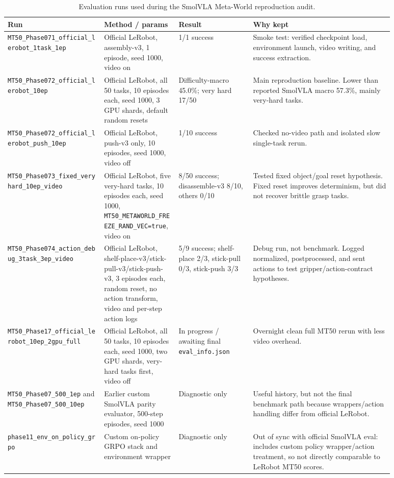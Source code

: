 \documentclass{article}
\begin{document}
\begin{table}[h]
  \centering
  \small
  \begin{tabular}{p{0.22\linewidth}p{0.17\linewidth}p{0.17\linewidth}p{0.32\linewidth}}
    \toprule
    Run & Method / params & Result & Why kept \\
    \midrule
    \texttt{MT50\_Phase071\_official\_lerobot\_1task\_1ep} & Official LeRobot, assembly-v3, 1 episode, seed 1000, video on & 1/1 success & Smoke test: verified checkpoint load, environment launch, video writing, and success extraction. \\
    \texttt{MT50\_Phase072\_official\_lerobot\_10ep} & Official LeRobot, all 50 tasks, 10 episodes each, seed 1000, 3 GPU shards, default random resets & Difficulty-macro 45.0\%; very hard 17/50 & Main reproduction baseline.  Lower than reported SmolVLA macro 57.3\%, mainly very-hard tasks. \\
    \texttt{MT50\_Phase072\_official\_lerobot\_push\_10ep} & Official LeRobot, push-v3 only, 10 episodes, seed 1000, video off & 1/10 success & Checked no-video path and isolated slow single-task rerun. \\
    \texttt{MT50\_Phase073\_fixed\_veryhard\_10ep\_video} & Official LeRobot, five very-hard tasks, 10 episodes each, seed 1000, \texttt{MT50\_METAWORLD\_FREEZE\_RAND\_VEC=true}, video on & 8/50 success; disassemble-v3 8/10, others 0/10 & Tested fixed object/goal reset hypothesis.  Fixed reset improves determinism, but did not recover brittle grasp tasks. \\
    \texttt{MT50\_Phase074\_action\_debug\_3task\_3ep\_video} & Official LeRobot, shelf-place-v3/stick-pull-v3/stick-push-v3, 3 episodes each, random reset, no action transform, video and per-step action logs & 5/9 success; shelf-place 2/3, stick-pull 0/3, stick-push 3/3 & Debug run, not benchmark.  Logged normalized, postprocessed, and sent actions to test gripper/action-contract hypotheses. \\
    \texttt{MT50\_Phase17\_official\_lerobot\_10ep\_2gpu\_full} & Official LeRobot, all 50 tasks, 10 episodes each, seed 1000, two GPU shards, very-hard tasks first, video off & In progress / awaiting final \texttt{eval\_info.json} & Overnight clean full MT50 rerun with less video overhead. \\
    \texttt{MT50\_Phase07\_500\_1ep} and \texttt{MT50\_Phase07\_500\_10ep} & Earlier custom SmolVLA parity evaluator, 500-step episodes, seed 1000 & Diagnostic only & Useful history, but not the final benchmark path because wrappers/action handling differ from official LeRobot. \\
    \texttt{phase11\_env\_on\_policy\_grpo} & Custom on-policy GRPO stack and environment wrapper & Diagnostic only & Out of sync with official SmolVLA eval: includes custom policy wrapper/action treatment, so not directly comparable to LeRobot MT50 scores. \\
    \bottomrule
  \end{tabular}
  \caption{Evaluation runs used during the SmolVLA Meta-World reproduction audit.}
  \label{tab:mt50-eval-ledger}
\end{table}
\end{document}
